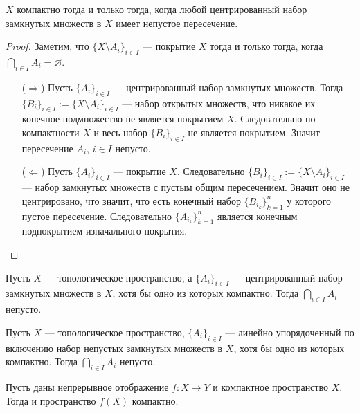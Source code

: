 \documentclass[12pt,a4paper]{article}
\begin{document}
    \begin{theorem}
        $X$ компактно тогда и только тогда, когда любой центрированный набор замкнутых множеств в $X$ имеет непустое пересечение.
    \end{theorem}

    \begin{proof}
        Заметим, что $\{X \setminus A_i\}_{i \in I}$ --- покрытие $X$ тогда и только тогда, когда $\bigcap_{i \in I} A_i = \varnothing$.

        \begin{itemize}
            \item[($\Rightarrow$)] Пусть $\{A_i\}_{i \in I}$ --- центрированный набор замкнутых множеств. Тогда $\{B_i\}_{i \in I} := \{X \setminus A_i\}_{i \in I}$ --- набор открытых множеств, что никакое их конечное подмножество не является покрытием $X$. Следовательно по компактности $X$ и весь набор $\{B_i\}_{i \in I}$ не является покрытием. Значит пересечение $A_i$, $i \in I$ непусто.

            \item[($\Leftarrow$)] Пусть $\{A_i\}_{i \in I}$ --- покрытие $X$. Следовательно $\{B_i\}_{i \in I} := \{X \setminus A_i\}_{i \in I}$ --- набор замкнутых множеств с пустым общим пересечением. Значит оно не центрировано, что значит, что есть конечный набор $\{B_{i_k}\}_{k=1}^n$ у которого пустое пересечение. Следовательно $\{A_{i_k}\}_{k=1}^n$ является конечным подпокрытием изначального покрытия.
        \end{itemize}
    \end{proof}

    \begin{corollary}\label{compactness-equivalence-closed-FIP-family-theorem-corollary-1}
        Пусть $X$ --- топологическое пространство, а $\{A_i\}_{i \in I}$ --- центрированный набор замкнутых множеств в $X$, хотя бы одно из которых компактно. Тогда $\bigcap_{i \in I} A_i$ непусто.
    \end{corollary}

    \begin{corollary}
        Пусть $X$ --- топологическое пространство, $\{A_i\}_{i \in I}$ --- линейно упорядоченный по включению набор непустых замкнутых множеств в $X$, хотя бы одно из которых компактно. Тогда $\bigcap_{i \in I} A_i$ непусто.
    \end{corollary}

    \begin{theorem}
        Пусть даны непрерывное отображение $f: X \to Y$ и компактное пространство $X$. Тогда и пространство $f(X)$ компактно.
    \end{theorem}
\end{document}
